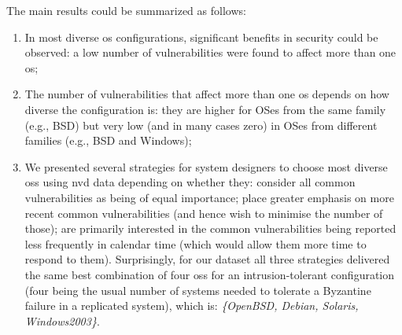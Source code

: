 The main results could be summarized as follows:
\begin{enumerate}
\item In most diverse \gls{os} configurations, significant  benefits in security could be observed: a low number of vulnerabilities were found to affect more than one \gls{os};

\item The number of vulnerabilities that affect more than one \gls{os} depends on how diverse the configuration is: they are higher for OSes from the same family (e.g., BSD) but very low (and in many cases zero) in OSes from different families (e.g., BSD and Windows);

\item We presented several strategies for system designers to choose most diverse \glspl{os} using \gls{nvd} data depending on whether they: consider all common vulnerabilities as being of equal importance; place greater emphasis on more recent common vulnerabilities (and hence wish to minimise the number of those); are primarily interested in the common vulnerabilities being reported less frequently in calendar time (which would allow them more time to respond to them). Surprisingly, for our dataset all three strategies delivered the same best combination of four \glspl{os} for an intrusion-tolerant configuration (four being the usual number of systems needed to tolerate a Byzantine failure in a replicated system), which is: \textit{\{OpenBSD, Debian, Solaris, Windows2003\}}.

\end{enumerate}



